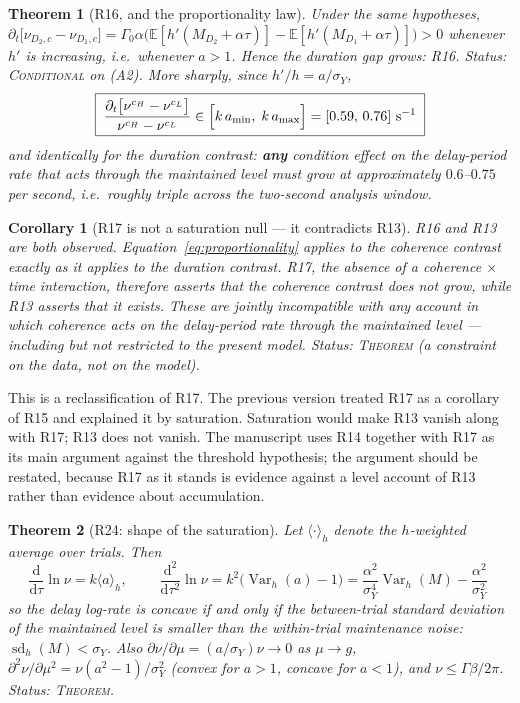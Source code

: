 \documentclass[11pt,a4paper]{article}
\newcommand{\E}{\mathbb{E}}
\newcommand{\Var}{\operatorname{Var}}
\newcommand{\dd}{\mathrm{d}}
\newcommand{\Mrv}{M}
\theoremstyle{plain}
\newtheorem{theorem}{Theorem}
\newtheorem{corollary}{Corollary}
\theoremstyle{remark}
\begin{document}
\begin{theorem}[R16, and the proportionality law]
\label{thm:R16}
Under the same hypotheses,
$\partial_t\bigl[\nu_{D_2,c}-\nu_{D_1,c}\bigr]=\Gamma_0\alpha\bigl(\E[h'(\Mrv_{D_2}+\alpha\tau)]
-\E[h'(\Mrv_{D_1}+\alpha\tau)]\bigr)>0$ whenever $h'$ is increasing, i.e.\ whenever
$a>1$. Hence the duration gap grows: R16. \emph{Status: \textsc{Conditional} on (A2).}
More sharply, since $h'/h=a/\sigma_Y$,
\begin{equation}
\boxed{\;
\frac{\partial_t\bigl[\nu^{c_H}-\nu^{c_L}\bigr]}{\nu^{c_H}-\nu^{c_L}}
\in\Bigl[k\,a_{\min},\;k\,a_{\max}\Bigr]
=[0.59,\,0.76]\ \text{s}^{-1}\;}
\label{eq:proportionality}
\end{equation}
and identically for the duration contrast: \textbf{any} condition effect on the
delay-period rate that acts through the maintained level must grow at approximately
$0.6$--$0.75$ per second, i.e.\ roughly triple across the two-second analysis window.
\end{theorem}

\begin{corollary}[R17 is not a saturation null --- it contradicts R13]
\label{cor:R17}
R16 and R13 are both observed. Equation~\eqref{eq:proportionality} applies to the
coherence contrast exactly as it applies to the duration contrast. R17, the absence of a
coherence $\times$ time interaction, therefore asserts that the coherence contrast does
\emph{not} grow, while R13 asserts that it exists. These are jointly incompatible with any
account in which coherence acts on the delay-period rate through the maintained level ---
including but not restricted to the present model.
\emph{Status: \textsc{Theorem} (a constraint on the data, not on the model).}
\end{corollary}

This is a reclassification of R17. The previous version treated R17 as a corollary of R15
and explained it by saturation. Saturation would make R13 vanish along with R17; R13 does
not vanish. The manuscript uses R14 together with R17 as its main argument against the
threshold hypothesis; the argument should be restated, because R17 as it stands is
evidence against a level account of R13 rather than evidence about accumulation.

\begin{theorem}[R24: shape of the saturation]
\label{thm:R24}
Let $\langle\cdot\rangle_h$ denote the $h$-weighted average over trials. Then
\begin{equation}
\frac{\dd}{\dd\tau}\ln\nu=k\langle a\rangle_h,\qquad
\boxed{\;\frac{\dd^{2}}{\dd\tau^{2}}\ln\nu
=k^{2}\bigl(\Var_h(a)-1\bigr)
=\frac{\alpha^{2}}{\sigma_Y^{4}}\Var_h(\Mrv)-\frac{\alpha^{2}}{\sigma_Y^{2}}\;}
\label{eq:curv}
\end{equation}
so the delay log-rate is concave if and only if the between-trial standard deviation of
the maintained level is smaller than the within-trial maintenance noise:
$\operatorname{sd}_h(\Mrv)<\sigma_Y$. Also
$\partial\nu/\partial\mu=(a/\sigma_Y)\nu\to0$ as $\mu\to g$,
$\partial^2\nu/\partial\mu^2=\nu(a^2-1)/\sigma_Y^{2}$ (convex for $a>1$, concave for
$a<1$), and $\nu\le\Gamma\beta/2\pi$. \emph{Status: \textsc{Theorem}.}
\end{theorem}
\end{document}
